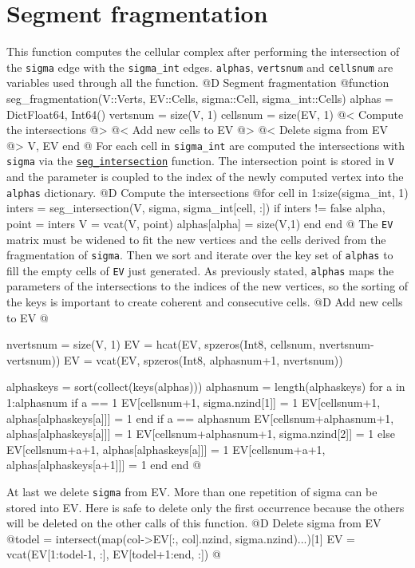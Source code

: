 \documentclass[10pt,oneside]{article}
\begin{document}
\section{Segment fragmentation}
This function computes the cellular complex after performing the intersection of the \texttt{sigma} edge 
with the \texttt{sigma\_int} edges.
\texttt{alphas}, \texttt{vertsnum} and \texttt{cellsnum} are variables used through all the function.
@D Segment fragmentation
@{function seg_fragmentation(V::Verts, EV::Cells, sigma::Cell, sigma_int::Cells)
    alphas = Dict{Float64, Int64}()
    vertsnum = size(V, 1)
    cellsnum = size(EV, 1)
    @< Compute the intersections @>
    @< Add new cells to EV @>
    @< Delete sigma from EV @>
    V, EV
end
@}
For each cell in \texttt{sigma\_int} are computed the intersections with \texttt{sigma} via 
the \hyperref[seg_intersection]{\texttt{seg\_intersection}} function. The intersection point is
stored in \texttt{V} and the parameter is coupled to the index of the newly computed vertex into 
the \texttt{alphas} dictionary.
@D Compute the intersections
@{for cell in 1:size(sigma_int, 1)
    inters = seg_intersection(V, sigma, sigma_int[cell, :])
    if inters != false
        alpha, point = inters
        V = vcat(V, point)
        alphas[alpha] = size(V,1)
    end
end
@}
The \texttt{EV} matrix must be widened to fit the new vertices and the cells derived from 
the fragmentation of \texttt{sigma}. Then we sort and iterate over the key set of \texttt{alphas}
to fill the empty cells of \texttt{EV} just generated. As previously stated, \texttt{alphas} maps 
the parameters of the intersections to the indices of the new vertices, so the sorting of the keys 
is important to create coherent and consecutive cells.
@D Add new cells to EV
@{nvertsnum = size(V, 1)
EV = hcat(EV, spzeros(Int8, cellsnum, nvertsnum-vertsnum))
EV = vcat(EV, spzeros(Int8, alphasnum+1, nvertsnum))

alphaskeys = sort(collect(keys(alphas)))
alphasnum = length(alphaskeys)
for a in 1:alphasnum
    if a == 1
        EV[cellsnum+1, sigma.nzind[1]] = 1
        EV[cellsnum+1, alphas[alphaskeys[a]]] = 1
    end
    if a == alphasnum
        EV[cellsnum+alphasnum+1, alphas[alphaskeys[a]]] = 1
        EV[cellsnum+alphasnum+1, sigma.nzind[2]] = 1
    else
        EV[cellsnum+a+1, alphas[alphaskeys[a]]] = 1
        EV[cellsnum+a+1, alphas[alphaskeys[a+1]]] = 1
    end
end
@}
At last we delete \texttt{sigma} from EV. More than one repetition of sigma can 
be stored into EV. Here is safe to delete only the first occurrence because the 
others will be deleted on the other calls of this function.
@D Delete sigma from EV
@{todel = intersect(map(col->EV[:, col].nzind, sigma.nzind)...)[1]
EV = vcat(EV[1:todel-1, :], EV[todel+1:end, :])
@}
\end{document}
